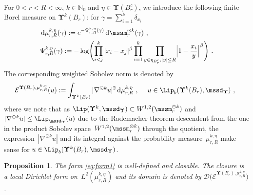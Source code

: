 \documentclass[11pt,letterpaper]{amsart}
\newcommand{\diff}{\mathop{}\!\mathrm{d}}
\newcommand{\N}{{\mathbb N}}
\newcommand{\comma}{\,\,\mathrm{,}\;\,}
\newcommand{\fstop}{\,\,\mathrm{.}}
\newcommand{\dUpsilon}{{\mathbf \Upsilon}}
\newcommand{\U}{\dUpsilon}
\newcommand{\E}{\mathcal E}
\renewcommand{\1}{\mathbf 1}
\numberwithin{equation}{section}
\theoremstyle{plain}
\newtheorem{prop}[thm]{Proposition}%
\theoremstyle{definition}
\theoremstyle{remark}
\begin{document}
 For $0<r<R<\infty$, $k \in \N_0$ and $\eta \in \U(B_r^c)$, we introduce the following finite Borel measure on $\U^k(B_r)$: for $\gamma=\sum_{i=1}^{k}\delta_{x_i}$
\begin{align} \label{d:TDLR}
&\diff \mu_{r, R}^{k, \eta}(\gamma) := e^{-\Psi^{k, \eta}_{r, R}(\gamma)}\diff \mssm_r^{\odot k}(\gamma) \comma
\\
& \Psi_{r, R}^{k, \eta}(\gamma) := - \log \Biggl(  \prod_{i < j}^k |x_i-x_j|^\beta \prod_{i=1}^k\prod_{y \in \eta_{B_r^c}, |y| \le R} \Bigl|1-\frac{x_i}{y}\Bigr|^\beta\Biggr) \fstop \notag
\end{align}
The corresponding weighted Sobolev norm is denoted by 
\begin{align} \label{eq:form1}
\E^{\U(B_r), \mu_{r, R}^{k, \eta}}(u) := \int_{\U^k(B_r)} |\nabla^{\odot k} u|^2 \diff \mu_{r, R}^{k, \eta} \comma \quad u \in \Lip_b(\U^k(B_r), \mssd_{\U}) \comma
\end{align}
where we note that as $\Lip(\U^k, \mssd_{\U}) \subset W^{1,2}(\mssm_r^{\odot k})$ and $|\nabla^{\odot k} u| \le \Lip_{\mssd_\U}(u)$ due to the Rademacher theorem descendent from the one in the product Sobolev space~$W^{1,2}(\mssm_r^{\otimes k})$ through the quotient, the expression~$|\nabla^{\odot k} u|$ and its integral against the probability measure~$\mu_{r, R}^{k, \eta}$ make sense for $u \in \Lip_b(\U^k(B_r), \mssd_{\U})$.
\begin{prop} \label{p:form1}
The  form \eqref{eq:form1} is well-defined and closable. The closure is a local Dirichlet form on~$L^2(\mu_{r, R}^{k, \eta})$ and its domain is denoted by $\mathcal D\bigl(\E^{\U(B_r), \mu_{r, R}^{k, \eta}})$. %
\end{prop}
\end{document}
